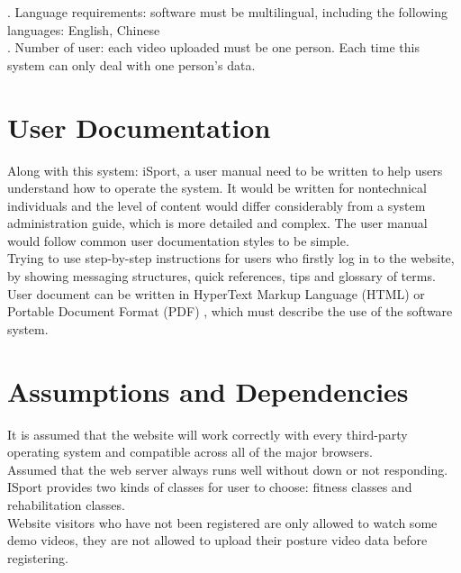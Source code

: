 \documentclass[16pt]{scrreprt}
\begin{document}
 
. Language requirements: software must be multilingual, including the following languages: English, Chinese\\

 
. Number of user: each video uploaded must be one person. Each time this system can only deal with one person's data.\\

 
\section{User Documentation}

 
Along with this system: iSport, a user manual need to be written to help users understand how to operate the system. It would be written for nontechnical individuals and the level of content would differ considerably from a system administration guide, which is more detailed and complex. The user manual would follow common user documentation styles to be simple.\\

 
Trying to use step-by-step instructions for users who firstly log in to the website, by showing messaging structures, quick references, tips and glossary of terms.\\

 
User document can be written in HyperText Markup Language (HTML) or Portable Document Format (PDF) , which must describe the use of the software system.

 
\section{Assumptions and Dependencies}

 
It is assumed that the website will work correctly with every third-party operating
system and compatible across all of the major browsers.\\

 
Assumed that the web server always runs well without down or not responding.\\

 
ISport provides two kinds of classes for user to choose: fitness classes and rehabilitation classes.\\

 
Website visitors who have not been registered are only allowed to watch some demo videos, they are not allowed to upload their posture video data before registering.\\
\end{document}

